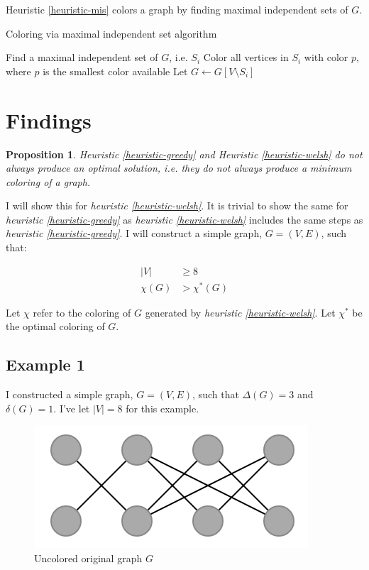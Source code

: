 \documentclass{article}
\newcounter{heuristic} \setcounter{heuristic}{0}
\newtheorem{prop}{Proposition}
\theoremstyle{definition}
\begin{document}
\heuristic{}\label{heuristic-mis}

Heuristic \ref{heuristic-mis} colors a graph by finding maximal independent sets of \(G\).

\begin{algorithm}
\caption{Coloring via maximal independent set algorithm}
\begin{algorithmic}[1]
\State Find a maximal independent set of $G$, i.e. $S_i$
\State Color all vertices in $S_i$ with color $p$, where $p$ is the smallest color available
\State Let $G \leftarrow G[V \setminus S_i ] $
\EndWhile
\end{algorithmic}
\end{algorithm}

\newpage

\section*{Findings}

\begin{prop}
Heuristic \ref{heuristic-greedy} and Heuristic \ref{heuristic-welsh} do not always produce an optimal solution, i.e. they do not always produce a minimum coloring of a graph.
\end{prop}

I will show this for \emph{heuristic \ref{heuristic-welsh}}. It is trivial to show the same for \emph{heuristic \ref{heuristic-greedy}} as \emph{heuristic \ref{heuristic-welsh}} includes the same steps as \emph{heuristic \ref{heuristic-greedy}}. I will construct a simple graph, \(G = (V, E)\), such that:

\begin{align}
|V| &\geq 8 \\
\chi(G) &> \chi^{*}(G)
\end{align}

Let \(\chi\) refer to the coloring of \(G\) generated by \emph{heuristic \ref{heuristic-welsh}}. Let \(\chi^{*}\) be the optimal coloring of \(G\).

\subsection*{Example 1}
I constructed a simple graph, \(G = (V, E)\), such that \(\Delta(G) = 3\) and \(\delta(G) = 1\). I've let \(|V| = 8\) for this example.

\begin{figure}[H]
\centering
\includegraphics[scale=0.6]{images/graph-1.png}
\caption{Uncolored original graph \(G\)}
\end{figure}
\end{document}

